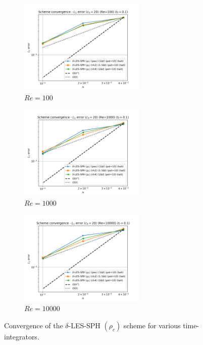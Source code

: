 \begin{figure}[H]
  \begin{subfigure}{7cm}
    \centering\includegraphics[width=6cm]{Code-Figures/deltales/integrator/dt_pois_conv_c0_20_re_100.png}
    \caption{$Re = 100$}
  \end{subfigure}
  \begin{subfigure}{7cm}
    \centering\includegraphics[width=6cm]{Code-Figures/deltales/integrator/dt_pois_conv_c0_20_re_1000.png}
    \caption{$Re = 1000$}
  \end{subfigure}
  \begin{subfigure}{7cm}
    \centering\includegraphics[width=6cm]{Code-Figures/deltales/integrator/dt_pois_conv_c0_20_re_10000.png}
    \caption{$Re = 10000$}
  \end{subfigure}
  \caption{Convergence of the $\delta$-LES-SPH $(\rho_c)$ scheme for various time-integrators.}
  \label{fig:deltales-integrator}
\end{figure}


